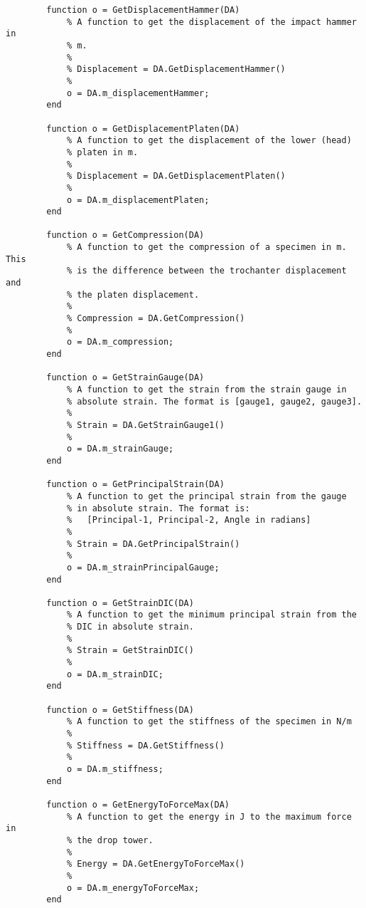 \begin{lstlisting}
        function o = GetDisplacementHammer(DA)
            % A function to get the displacement of the impact hammer in
            % m.
            %
            % Displacement = DA.GetDisplacementHammer()
            %
            o = DA.m_displacementHammer;
        end
        
        function o = GetDisplacementPlaten(DA)
            % A function to get the displacement of the lower (head)
            % platen in m.
            %
            % Displacement = DA.GetDisplacementPlaten()
            %
            o = DA.m_displacementPlaten;
        end
        
        function o = GetCompression(DA)
            % A function to get the compression of a specimen in m. This
            % is the difference between the trochanter displacement and 
            % the platen displacement.
            %
            % Compression = DA.GetCompression()
            %
            o = DA.m_compression;
        end
        
        function o = GetStrainGauge(DA)
            % A function to get the strain from the strain gauge in
            % absolute strain. The format is [gauge1, gauge2, gauge3].
            %
            % Strain = DA.GetStrainGauge1()
            %
            o = DA.m_strainGauge;
        end
        
        function o = GetPrincipalStrain(DA)
            % A function to get the principal strain from the gauge
            % in absolute strain. The format is:
            %   [Principal-1, Principal-2, Angle in radians]
            %
            % Strain = DA.GetPrincipalStrain()
            %
            o = DA.m_strainPrincipalGauge;
        end
        
        function o = GetStrainDIC(DA)
            % A function to get the minimum principal strain from the
            % DIC in absolute strain.
            % 
            % Strain = GetStrainDIC()
            %
            o = DA.m_strainDIC;
        end
        
        function o = GetStiffness(DA)
            % A function to get the stiffness of the specimen in N/m
            %
            % Stiffness = DA.GetStiffness()
            %
            o = DA.m_stiffness;
        end
        
        function o = GetEnergyToForceMax(DA)
            % A function to get the energy in J to the maximum force in
            % the drop tower.
            %
            % Energy = DA.GetEnergyToForceMax()
            %
            o = DA.m_energyToForceMax;
        end
        

\end{lstlisting}
